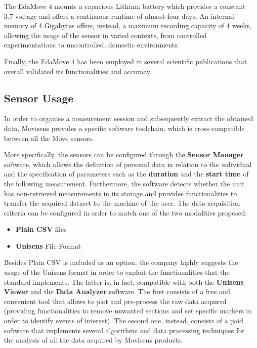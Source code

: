 The EdaMove 4 mounts a capacious Lithium battery which provides a constant 3.7 voltage and offers a continuous runtime of almost four days. An internal memory of 4 Gigabytes offers, instead, a maximum recording capacity of 4 weeks, allowing the usage of the sensor in varied contexts, from controlled experimentations to uncontrolled, domestic environments. 

Finally, the EdaMove 4 has been employed in several scientific publications that overall validated its functionalities and accuracy.

\subsection{Sensor Usage}\label{subsec:edamove4-usage}

In order to organise a measurement session and subsequently extract the obtained data, Movisens provides a specific software toolchain, which is cross-compatible between all the Move sensors. 

More specifically, the sensors can be configured through the \textbf{Sensor Manager} software, which allows the definition of personal data in relation to the individual and the specification of parameters such as the \textbf{duration} and the \textbf{start time} of the following measurement. Furthermore, the software detects whether the unit has non-retrieved measurements in its storage and provides functionalities to transfer the acquired dataset to the machine of the user. The data acquisition criteria can be configured in order to match one of the two modalities proposed: 

\begin{itemize}
    \item \textbf{Plain CSV} files
    \item \textbf{Unisens} File Format 
\end{itemize}

Besides Plain CSV is included as an option, the company highly suggests the usage of the Unisens format in order to exploit the functionalities that the standard implements. The latter is, in fact, compatible with both the \textbf{Unisens Viewer} and the \textbf{Data Analyzer} software. The first consists of a free and convenient tool that allows to plot and pre-process the raw data acquired (providing functionalities to remove unwanted sections and set specific markers in order to identify events of interest). The second one, instead, consists of a paid software that implements several algorithms and data processing techniques for the analysis of all the data acquired by Movisens products.

